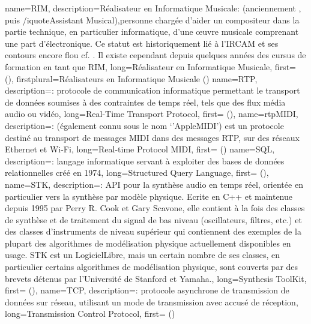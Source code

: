 {
    name={RIM},
    description={Réalisateur en Informatique Musicale: (anciennement , puis /iquote{Assistant Musical}),personne chargée d'aider un compositeur dans la partie technique, en particulier informatique, d'une œuvre musicale comprenant une part d'électronique. Ce statut est historiquement lié à l'IRCAM et ses contours encore flou cf. \cite{zattra_les_2013}. Il existe cependant depuis quelques années des cursus de formation en tant que RIM},
    long={Réalisateur en Informatique Musicale},
    first={} (),
    firstplural={Réalisateurs en Informatique Musicale (\glspluralsuffix)}
}
{
    name={RTP},
    description={\textit{}: protocole de communication informatique permettant le transport de données soumises à des contraintes de temps réel, tels que des flux média audio ou vidéo},
    long={Real-Time Transport Protocol},
    first={} (),
}
{
    name={rtpMIDI},
    description={\textit{}: (également connu sous le nom `'AppleMIDI') est un protocole destiné au transport de messages MIDI dans des messages \gls{RTP}, sur des réseaux Ethernet et Wi-Fi},
    long={Real-time Protocol MIDI},
    first={} ()
}
{
    name={SQL},
    description={\textit{}: langage informatique servant à exploiter des bases de données relationnelles créé en 1974},
    long={Structured Query Language},
    first={} (),
}
{
    name={STK},
    description={\textit{}: \gls{API} pour la synthèse audio en temps réel, orientée en particulier vers la synthèse par modèle physique. Ecrite en C++ et maintenue depuis 1995 par Perry R. Cook et Gary Scavone, elle contient à la fois des classes de synthèse et de traitement du signal de bas niveau (oscillateurs, filtres, etc.) et des classes d'instruments de niveau supérieur qui contiennent des exemples de la plupart des algorithmes de modélisation physique actuellement disponibles en usage. STK est un \gls{LogicielLibre}, mais un certain nombre de ses classes, en particulier certains algorithmes de modélisation physique, sont couverts par des brevets détenus par l'Université de Stanford et Yamaha.},
    long={Synthesis ToolKit},
    first={} (),
}
{
    name={TCP},
    description={\textit{}: protocole asynchrone de transmission de données sur réseau, utilisant un mode de transmission avec accusé de réception},
    long={Transmission Control Protocol},
    first={} ()
}
